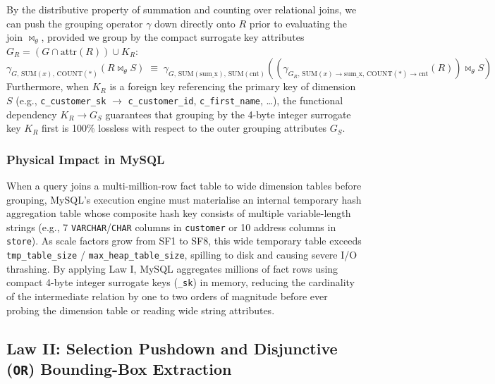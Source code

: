 \documentclass{ULBreport}
\begin{document}
By the distributive property of summation and counting over relational joins, we can push the grouping operator $\gamma$ down directly onto $R$ prior to evaluating the join $\bowtie_{\theta}$, provided we group by the compact surrogate key attributes $G_R = (G \cap \text{attr}(R)) \cup K_R$:
\begin{equation}
\gamma_{G,\, \text{SUM}(x),\, \text{COUNT}(*)}\left(R \bowtie_{\theta} S\right) \;\equiv\; \gamma_{G,\, \text{SUM}(\text{sum\_x}),\, \text{SUM}(\text{cnt})}\left( \left(\gamma_{G_R,\, \text{SUM}(x)\to\text{sum\_x},\, \text{COUNT}(*)\to\text{cnt}}(R)\right) \bowtie_{\theta} S \right)
\end{equation}
Furthermore, when $K_R$ is a foreign key referencing the primary key of dimension $S$ (e.g., \texttt{c\_customer\_sk} $\to$ \texttt{c\_customer\_id}, \texttt{c\_first\_name}, \dots), the functional dependency $K_R \to G_S$ guarantees that grouping by the 4-byte integer surrogate key $K_R$ first is 100\% lossless with respect to the outer grouping attributes $G_S$.

\subsubsection{Physical Impact in MySQL}
When a query joins a multi-million-row fact table to wide dimension tables before grouping, MySQL's execution engine must materialise an internal temporary hash aggregation table whose composite hash key consists of multiple variable-length strings (e.g., 7 \texttt{VARCHAR}/\texttt{CHAR} columns in \texttt{customer} or 10 address columns in \texttt{store}). As scale factors grow from SF1 to SF8, this wide temporary table exceeds \texttt{tmp\_table\_size} / \texttt{max\_heap\_table\_size}, spilling to disk and causing severe I/O thrashing. By applying Law I, MySQL aggregates millions of fact rows using compact 4-byte integer surrogate keys (\texttt{\_sk}) in memory, reducing the cardinality of the intermediate relation by one to two orders of magnitude before ever probing the dimension table or reading wide string attributes.

\subsection{Law II: Selection Pushdown and Disjunctive (\texttt{OR}) Bounding-Box Extraction}
\end{document}
